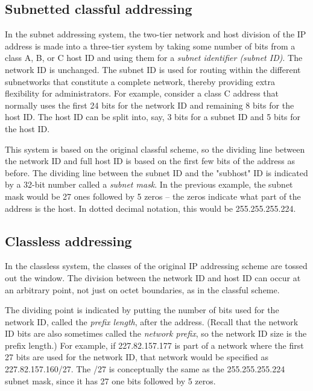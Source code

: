 \documentclass[b5paper,11pt]{memoir}
\begin{document}
\subsection{Subnetted classful addressing}

In the subnet addressing system, the two-tier network and host division
of the IP address is made into a three-tier system by taking some number
of bits from a class A, B, or C host ID and using them for a
{\emph{subnet identifier (subnet ID)}}. The network ID is unchanged. The
subnet ID is used for routing within the different subnetworks that
constitute a complete network, thereby providing extra flexibility for
administrators. For example, consider a class C address that normally
uses the first 24 bits for the network ID and remaining 8 bits for the
host ID. The host ID can be split into, say, 3 bits for a subnet ID and
5 bits for the host ID.

This system is based on the original classful scheme, so the dividing
line between the network ID and full host ID is based on the first few
bits of the address as before. The dividing line between the subnet ID
and the "subhost" ID is indicated by a 32-bit number called a
{\emph{subnet mask}}. In the previous example, the subnet mask would be
27 ones followed by 5 zeros -- the zeros indicate what part of the
address is the host. In dotted decimal notation, this would be
255.255.255.224.




\subsection{Classless addressing}

In the classless system, the classes of the original IP addressing
scheme are tossed out the window. The division between the network ID
and host ID can occur at an arbitrary point, not just on octet
boundaries, as in the classful scheme.

The dividing point is indicated by putting the number of bits used for
the network ID, called the {\emph{prefix length}}, after the address.
(Recall that the network ID bits are also sometimes called the
{\emph{network prefix}}, so the network ID size is the prefix length.)
For example, if 227.82.157.177 is part of a network where the first 27
bits are used for the network ID, that network would be specified as
227.82.157.160/27. The /27 is conceptually the same as the
255.255.255.224 subnet mask, since it has 27 one bits followed by 5
zeros.
\end{document}
